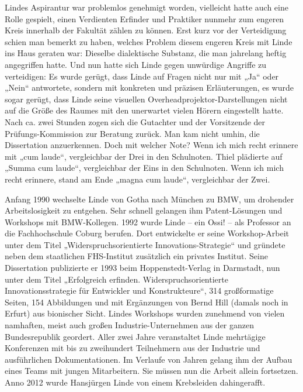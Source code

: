 \documentclass[11pt,a4paper]{article}
\begin{document}
Lindes Aspirantur war problemlos genehmigt worden, vielleicht hatte auch eine
Rolle gespielt, einen Verdienten Erfinder und Praktiker nunmehr zum engeren
Kreis innerhalb der Fakultät zählen zu können. Erst kurz vor der Verteidigung
schien man bemerkt zu haben, welches Problem diesem engeren Kreis mit Linde ins
Haus geraten war: Dieselbe dialektische Substanz, die man jahrelang heftig
angegriffen hatte. Und nun hatte sich Linde gegen unwürdige Angriffe zu
verteidigen: Es wurde gerügt, dass Linde auf Fragen nicht nur mit „Ja“ oder
„Nein“ antwortete, sondern mit konkreten und präzisen Erläuterungen, es wurde
sogar gerügt, dass Linde seine visuellen Overheadprojektor-Darstellungen nicht
auf die Größe des Raumes mit den unerwartet vielen Hörern eingestellt hatte.
Nach ca. zwei Stunden zogen sich die Gutachter und der Vorsitzende der
Prüfungs-Kommission zur Beratung zurück.  Man kam nicht umhin, die Dissertation
anzuerkennen. Doch mit welcher Note? Wenn ich mich recht erinnere mit „cum
laude“, vergleichbar der Drei in den Schulnoten. Thiel plädierte auf „Summa cum
laude“, vergleichbar der Eins in den Schulnoten. Wenn ich mich recht erinnere,
stand am Ende „magna cum laude“, vergleichbar der Zwei.

Anfang 1990 wechselte Linde von Gotha nach München zu BMW, um drohender
Arbeitslosigkeit zu entgehen. Sehr schnell gelangen ihm Patent-Lösungen und
Workshops mit BMW-Kollegen. 1992 wurde Linde – ein Ossi!  -- als Professor an
die Fachhochschule Coburg berufen. Dort entwickelte er seine Workshop-Arbeit
unter dem Titel „Widerspruchsorientierte Innovations-Strategie“ und gründete
neben dem staatlichen FHS-Institut zusätzlich ein privates Institut. Seine
Dissertation publizierte er 1993 beim Hoppenstedt-Verlag in Darmstadt, nun
unter dem Titel „Erfolgreich erfinden.  Widerspruchsorientierte
Innovationsstrategie für Entwickler und Konstrukteure“, 314 großformatige
Seiten, 154 Abbildungen und mit Ergänzungen von Bernd Hill (damals noch in
Erfurt) aus bionischer Sicht.  Lindes Workshops wurden zunehmend von vielen
namhaften, meist auch großen Industrie-Unternehmen aus der ganzen
Bundesrepublik geordert.  Aller zwei Jahre veranstaltet Linde mehrtägige
Konferenzen mit bis zu zweihundert Teilnehmern aus der Industrie und
ausführlichen Dokumentationen. Im Verlaufe von Jahren gelang ihm der Aufbau
eines Teams mit jungen Mitarbeitern. Sie müssen nun die Arbeit allein
fortsetzen.  Anno 2012 wurde Hansjürgen Linde von einem Krebsleiden
dahingerafft.
\end{document}
